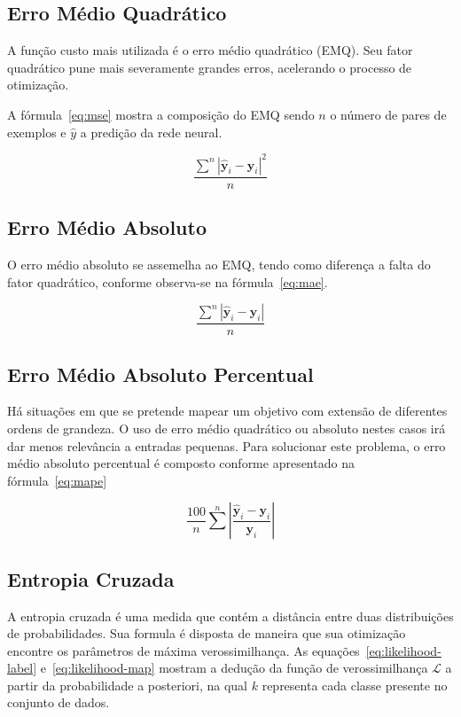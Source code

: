 \subsection{Erro Médio Quadrático}

A função custo mais utilizada é o erro médio quadrático (EMQ). Seu fator quadrático pune mais severamente grandes erros, acelerando o processo de otimização.

A fórmula~\ref{eq:mse} mostra a composição do EMQ sendo $n$ o número de pares de exemplos e $\hat{y}$ a predição da rede neural.

\begin{equation} \label{eq:mse}
    \frac{\displaystyle\sum^n |\hat{\mathbf{y}}_i - \mathbf{y}_i|^2}{n}
\end{equation}

\subsection{Erro Médio Absoluto}

O erro médio absoluto se assemelha ao EMQ, tendo como diferença a falta do fator quadrático, conforme observa-se na fórmula~\ref{eq:mae}.

\begin{equation} \label{eq:mae}
    \frac{\displaystyle\sum^n |\hat{\mathbf{y}}_i - \mathbf{y}_i|}{n}
\end{equation}

\subsection{Erro Médio Absoluto Percentual}

Há situações em que se pretende mapear um objetivo com extensão de diferentes ordens de grandeza. O uso de erro médio quadrático ou absoluto nestes casos irá dar menos relevância a entradas pequenas. Para solucionar este problema, o erro médio absoluto percentual é composto conforme apresentado na fórmula~\ref{eq:mape}

\begin{equation} \label{eq:mape}
    \frac{100}{n}\sum^n \left|\frac{\hat{\mathbf{y}}_i - \mathbf{y}_i}{\mathbf{y}_i}\right|
\end{equation}

\subsection{Entropia Cruzada}

A entropia cruzada é uma medida que contém a distância entre duas distribuições de probabilidades. Sua formula é disposta de maneira que sua otimização encontre os parâmetros de máxima verossimilhança. As equações~\ref{eq:likelihood-label} e~\ref{eq:likelihood-map} mostram a dedução da função de verossimilhança $\mathcal{L}$ a partir da probabilidade a posteriori, na qual $k$ representa cada classe presente no conjunto de dados.

